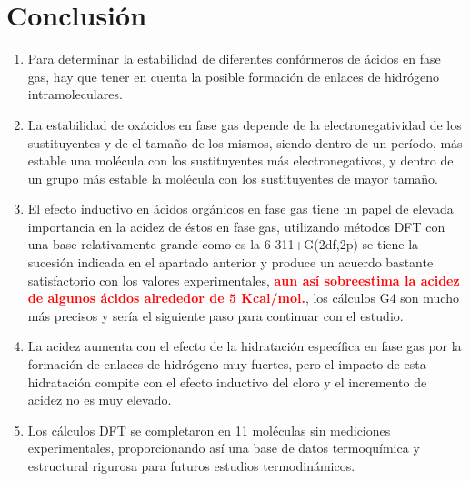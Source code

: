 \chapter{Conclusión}

\begin{enumerate}
	\item Para determinar la estabilidad de diferentes confórmeros de ácidos en fase gas, hay que tener en cuenta la posible formación de enlaces de hidrógeno intramoleculares.
	\item La estabilidad de oxácidos en fase gas depende de la electronegatividad de los sustituyentes y de el tamaño de los mismos, siendo dentro de un período, más estable una molécula con los sustituyentes más electronegativos, y dentro de un grupo más estable la molécula con los sustituyentes de mayor tamaño.
	\item El efecto inductivo en ácidos orgánicos en fase gas tiene un papel de elevada importancia en la acidez de éstos en fase gas, utilizando métodos DFT con una base relativamente grande como es la 6-311+G(2df,2p) se tiene la sucesión indicada en el apartado anterior y produce un acuerdo bastante satisfactorio con los valores experimentales,  {\bfseries\textcolor{red} {aun así sobreestima la acidez de algunos ácidos alrededor de 5 Kcal/mol.}}, los cálculos G4 son mucho más precisos y sería el siguiente paso para continuar con el estudio.
	\item La acidez aumenta con el efecto de la hidratación específica en fase gas por la formación de enlaces de hidrógeno muy fuertes, pero el impacto de esta hidratación compite con el efecto inductivo del cloro y el incremento de acidez no es muy elevado.
	\item Los cálculos DFT se completaron en 11 moléculas sin mediciones experimentales, proporcionando así una base de datos termoquímica y estructural rigurosa para futuros estudios termodinámicos.
	
	
\end{enumerate}